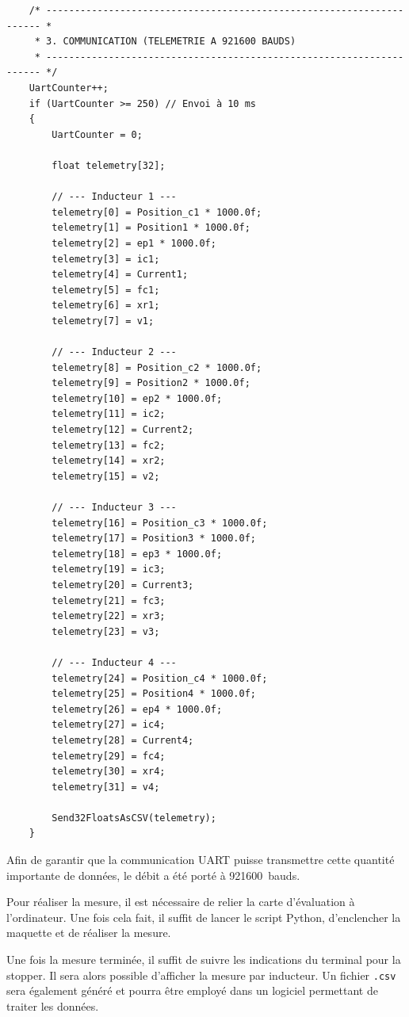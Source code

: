 \begin{verbatim}
    /* --------------------------------------------------------------------- *
     * 3. COMMUNICATION (TELEMETRIE A 921600 BAUDS)
     * --------------------------------------------------------------------- */
    UartCounter++;
    if (UartCounter >= 250) // Envoi à 10 ms
    {
        UartCounter = 0;

        float telemetry[32];

        // --- Inducteur 1 ---
        telemetry[0] = Position_c1 * 1000.0f;
        telemetry[1] = Position1 * 1000.0f;
        telemetry[2] = ep1 * 1000.0f;
        telemetry[3] = ic1;
        telemetry[4] = Current1;
        telemetry[5] = fc1;
        telemetry[6] = xr1;
        telemetry[7] = v1;

        // --- Inducteur 2 ---
        telemetry[8] = Position_c2 * 1000.0f;
        telemetry[9] = Position2 * 1000.0f;
        telemetry[10] = ep2 * 1000.0f;
        telemetry[11] = ic2;
        telemetry[12] = Current2;
        telemetry[13] = fc2;
        telemetry[14] = xr2;
        telemetry[15] = v2;

        // --- Inducteur 3 ---
        telemetry[16] = Position_c3 * 1000.0f;
        telemetry[17] = Position3 * 1000.0f;
        telemetry[18] = ep3 * 1000.0f;
        telemetry[19] = ic3;
        telemetry[20] = Current3;
        telemetry[21] = fc3;
        telemetry[22] = xr3;
        telemetry[23] = v3;

        // --- Inducteur 4 ---
        telemetry[24] = Position_c4 * 1000.0f;
        telemetry[25] = Position4 * 1000.0f;
        telemetry[26] = ep4 * 1000.0f;
        telemetry[27] = ic4;
        telemetry[28] = Current4;
        telemetry[29] = fc4;
        telemetry[30] = xr4;
        telemetry[31] = v4;

        Send32FloatsAsCSV(telemetry);
    }
\end{verbatim}

Afin de garantir que la communication UART puisse transmettre cette quantité importante de données, le débit a été porté à 921600~bauds.

Pour réaliser la mesure, il est nécessaire de relier la carte d'évaluation à l'ordinateur. Une fois cela fait, il suffit de lancer le script Python, d'enclencher la maquette et de réaliser la mesure.

Une fois la mesure terminée, il suffit de suivre les indications du terminal pour la stopper. Il sera alors possible d'afficher la mesure par inducteur. Un fichier \texttt{.csv} sera également généré et pourra être employé dans un logiciel permettant de traiter les données.

